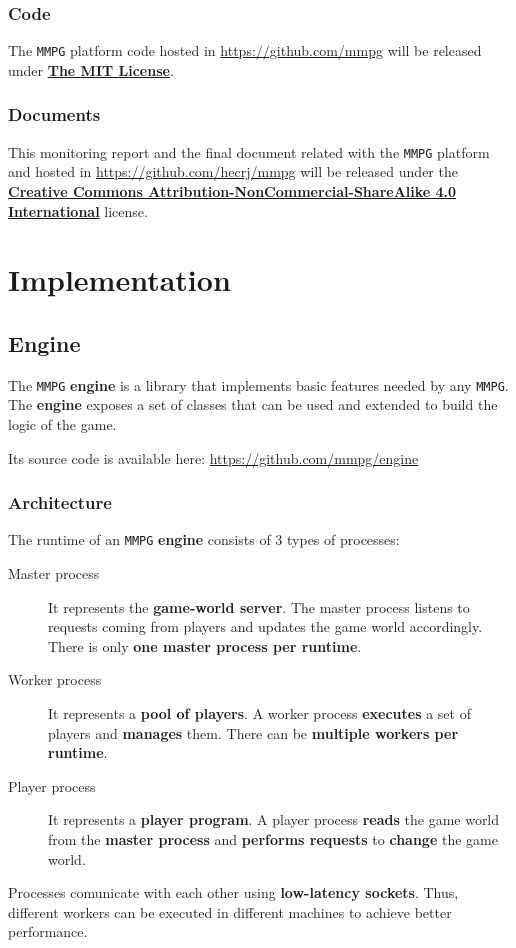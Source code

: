 \documentclass[a4paper,11pt,titlepage,abstract,numbers=noenddot,automark,mnsy,intlimits,rgb,dvipsnames]{report}
\begin{document}
\section{Code}
The \texttt{MMPG} platform code hosted in \url{https://github.com/mmpg} will be released under
\href{https://opensource.org/licenses/MIT}{\textbf{The MIT License}}.
\section{Documents}
This monitoring report and the final document related with the \texttt{MMPG} platform and hosted in
\url{https://github.com/hecrj/mmpg} will be released under the
\href{http://creativecommons.org/licenses/by-nc-sa/4.0/legalcode.txt}{\textbf{Creative Commons Attribution-NonCommercial-ShareAlike 4.0 International}}
license.
\clearpage
\part{Implementation}
\chapter{Engine}
The \texttt{MMPG} \textbf{engine} is a library that implements basic features needed by any \texttt{MMPG}. The \textbf{engine} exposes a set
of classes that can be used and extended to build the logic of the game.

Its source code is available here: \url{https://github.com/mmpg/engine}
\section{Architecture}
The runtime of an \texttt{MMPG} \textbf{engine} consists of 3 types of processes:
\begin{description}
\item[Master process]
It represents the \textbf{game-world server}. The master process listens to requests coming from
players and updates the game world accordingly. There is only \textbf{one master process per runtime}.
\item[Worker process]
It represents a \textbf{pool of players}. A worker process \textbf{executes} a set of players and
  \textbf{manages} them. There can be \textbf{multiple workers per runtime}.
\item[Player process]
It represents a \textbf{player program}. A player process \textbf{reads} the game world from the
  \textbf{master process} and \textbf{performs requests} to \textbf{change} the game world.
\end{description}
Processes comunicate with each other using \textbf{low-latency sockets}. Thus, different workers can be executed
in different machines to achieve better performance.
\end{document}
